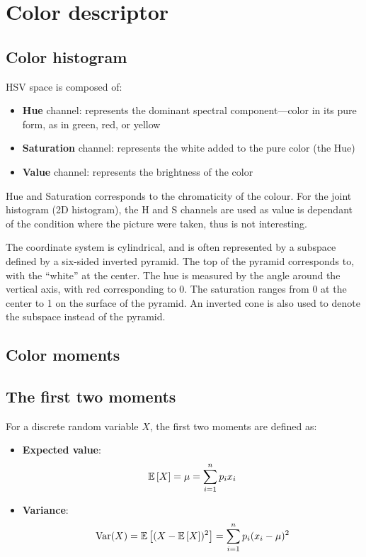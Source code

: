 \section{Color descriptor}
\subsection{Color histogram}

HSV space is composed of:
\begin{itemize}
    \item \textbf{Hue} channel: represents the dominant spectral component—color in its pure form, as in green, red, or yellow
    \item \textbf{Saturation} channel: represents the white added to the pure color (the Hue)
    \item \textbf{Value} channel: represents the brightness of the color
\end{itemize}

Hue and Saturation corresponds to the chromaticity of the colour. For the joint histogram (2D histogram), the H and S channels are used as value is dependant of the condition where the picture were taken, thus is not interesting.

The coordinate system is cylindrical, and is often represented by a subspace defined by a six-sided inverted pyramid. The top of the pyramid corresponds to, with the “white” at the center. The hue is measured by the angle around the vertical axis, with red corresponding to 0. The saturation
ranges from 0 at the center to 1 on the surface of the pyramid. An inverted cone is also used to denote the subspace instead of the pyramid.

\subsection{Color moments}

\subsection{The first two moments}

For a discrete random variable $X$, the first two moments are defined as:
\begin{itemize}
    \item \textbf{Expected value}: $$\mathbb{E} \left[ X \right] = \mu = \sum_{i = 1}^{n} p_i x_i $$
    \item \textbf{Variance}:  $$ \operatorname{Var} (X)= \mathbb{E} \left[ (X - \mathbb{E} \left[ X \right] )^2 \right] =\sum _{i=1}^{n} p_i (x_{i} - \mu )^{2} $$
\end{itemize}

